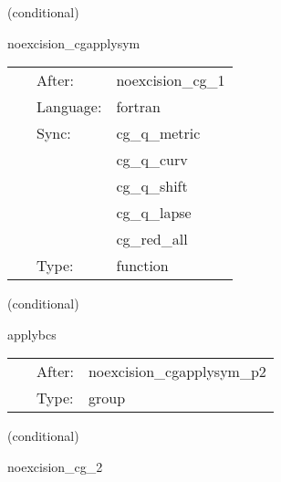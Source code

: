 \vspace{5mm}

   (conditional) 

\hspace{5mm} noexcision\_cgapplysym 

\hspace{5mm}{\it select variables for boundary conditions 2 } 


\hspace{5mm}

 \begin{tabular*}{160mm}{cll} 
~ & After:  & noexcision\_cg\_1 \\ 
~ & Language:  & fortran \\ 
~ & Sync:  & cg\_q\_metric \\ 
~& ~ &cg\_q\_curv\\ 
~& ~ &cg\_q\_shift\\ 
~& ~ &cg\_q\_lapse\\ 
~& ~ &cg\_red\_all\\ 
~ & Type:  & function \\ 
\end{tabular*} 


\vspace{5mm}

   (conditional) 

\hspace{5mm} applybcs 

\hspace{5mm}{\it apply boundary conditions (symmetries) 2 } 


\hspace{5mm}

 \begin{tabular*}{160mm}{cll} 
~ & After:  & noexcision\_cgapplysym\_p2 \\ 
~ & Type:  & group \\ 
\end{tabular*} 


\vspace{5mm}

   (conditional) 

\hspace{5mm} noexcision\_cg\_2 

\hspace{5mm}{\it conjugate gradients step 2 } 


\hspace{5mm}

